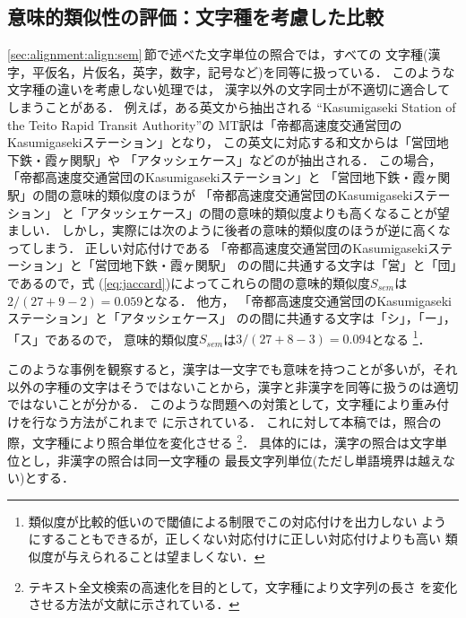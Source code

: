 \subsection{意味的類似性の評価：文字種を考慮した比較}
\label{sec:alignment:align:sem_chartype}

\ref{sec:alignment:align:sem}\,節で述べた文字単位の照合では，すべての
文字種(漢字，平仮名，片仮名，英字，数字，記号など)を同等に扱っている．
このような文字種の違いを考慮しない処理では，
漢字以外の文字同士が不適切に適合してしまうことがある． 
例えば，ある英文から抽出される
{\CPNP}``Kasumigaseki Station of the Teito Rapid Transit Authority''の
MT訳は「帝都高速度交通営団のKasumigasekiステーション」となり，
この英文に対応する和文からは「営団地下鉄・霞ヶ関駅」や
「アタッシェケース」などの{\JNP}が抽出される． 
この場合，「帝都高速度交通営団のKasumigasekiステーション」と
「営団地下鉄・霞ヶ関駅」の間の意味的類似度のほうが
「帝都高速度交通営団のKasumigasekiステーション」
と「アタッシェケース」の間の意味的類似度よりも高くなることが望ましい．
しかし，実際には次のように後者の意味的類似度のほうが逆に高くなってしまう．
正しい対応付けである
「帝都高速度交通営団のKasumigasekiステーション」と「営団地下鉄・霞ヶ関駅」
の{\N}の間に共通する文字は「営」と「団」であるので，式
(\ref{eq:jaccard})によってこれらの間の意味的類似度$S_{sem}$は
$2/(27+9-2) = 0.059$となる． 
他方，
「帝都高速度交通営団のKasumigasekiステーション」と「アタッシェケース」
の{\N}の間に共通する文字は「シ」，「ー」，「ス」であるので，
意味的類似度$S_{sem}$は$3/(27+8-3) = 0.094$となる
\footnote{類似度が比較的低いので閾値による制限でこの対応付けを出力しない
ようにすることもできるが，正しくない対応付けに正しい対応付けよりも高い
類似度が与えられることは望ましくない．}． 

このような事例を観察すると，漢字は一文字でも意味を持つことが多いが，それ
以外の字種の文字はそうではないことから，漢字と非漢字を同等に扱うのは適切
ではないことが分かる．
このような問題への対策として，文字種により重み付けを行なう方法がこれまで
に示されている\cite{Baldwin01}．
これに対して本稿では，照合の際，文字種により照合単位を変化させる
\footnote{テキスト全文検索の高速化を目的として，文字種により文字列の長さ
を変化させる方法が文献\cite{Fukushima97,Matsui97}に示されている．}．
具体的には，漢字の照合は文字単位とし，非漢字の照合は同一文字種の
最長文字列単位(ただし単語境界は越えない)とする． 

